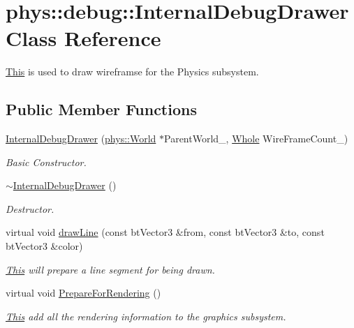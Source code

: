 \hypertarget{classphys_1_1debug_1_1InternalDebugDrawer}{
\section{phys::debug::InternalDebugDrawer Class Reference}
\label{db/d27/classphys_1_1debug_1_1InternalDebugDrawer}
}


\hyperlink{structThis}{This} is used to draw wireframse for the Physics subsystem.  


\subsection*{Public Member Functions}
\begin{DoxyCompactItemize}
\item 
\hyperlink{classphys_1_1debug_1_1InternalDebugDrawer_a0e701e00e1080fdadfcf35e9051789a3}{InternalDebugDrawer} (\hyperlink{classphys_1_1World}{phys::World} $\ast$ParentWorld\_\-, \hyperlink{namespacephys_a460f6bc24c8dd347b05e0366ae34f34a}{Whole} WireFrameCount\_)
\begin{DoxyCompactList}\small\item\em Basic Constructor. \item\end{DoxyCompactList}\item 
\hyperlink{classphys_1_1debug_1_1InternalDebugDrawer_a9b5cb5ec48541effddb305de12508323}{$\sim$InternalDebugDrawer} ()
\begin{DoxyCompactList}\small\item\em Destructor. \item\end{DoxyCompactList}\item 
virtual void \hyperlink{classphys_1_1debug_1_1InternalDebugDrawer_a8a35c3c80fddaaec8e21f737ed1b3938}{drawLine} (const btVector3 \&from, const btVector3 \&to, const btVector3 \&color)
\begin{DoxyCompactList}\small\item\em \hyperlink{structThis}{This} will prepare a line segment for being drawn. \item\end{DoxyCompactList}\item 
virtual void \hyperlink{classphys_1_1debug_1_1InternalDebugDrawer_a1002293d223ca20e5bccc3c3412ce262}{PrepareForRendering} ()
\begin{DoxyCompactList}\small\item\em \hyperlink{structThis}{This} add all the rendering information to the graphics subsystem. \item\end{DoxyCompactList}\item 

\end{DoxyCompactItemize}
